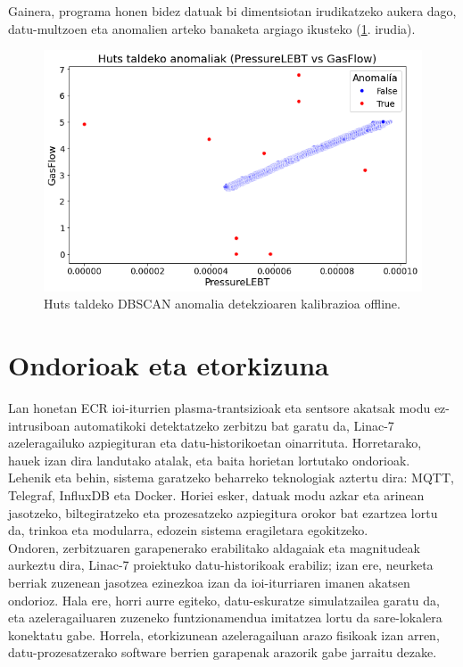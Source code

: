 \documentclass[12pt]{article}
\numberwithin{figure}{section}
\numberwithin{equation}{section}
\begin{document}
Gainera, programa honen bidez datuak bi dimentsiotan irudikatzeko aukera dago, datu-multzoen eta anomalien arteko banaketa argiago ikusteko (\ref{fig:dbscan_anomaliak_2}. irudia).
\begin{figure}[h]
    \centering
    \includegraphics[width=0.6\linewidth]{5 - Zerbitzuaren garapena/dbscan_anomaliak2.png}
    \caption{Huts taldeko DBSCAN anomalia detekzioaren kalibrazioa offline.}
    \label{fig:dbscan_anomaliak_2}
\end{figure}
\newpage
\section{Ondorioak eta etorkizuna}
Lan honetan ECR ioi-iturrien plasma-trantsizioak eta sentsore akatsak modu ez-intrusiboan automatikoki detektatzeko zerbitzu bat garatu da, Linac-7 azeleragailuko azpiegituran eta datu-historikoetan oinarrituta. Horretarako, hauek izan dira landutako atalak, eta baita horietan lortutako ondorioak.\\

Lehenik eta behin, sistema garatzeko beharreko teknologiak aztertu dira: MQTT, Telegraf, InfluxDB eta Docker. Horiei esker, datuak modu azkar eta arinean jasotzeko, biltegiratzeko eta prozesatzeko azpiegitura orokor bat ezartzea lortu da, trinkoa eta modularra, edozein sistema eragiletara egokitzeko.\\

Ondoren, zerbitzuaren garapenerako erabilitako aldagaiak eta magnitudeak aurkeztu dira, Linac-7 proiektuko datu-historikoak erabiliz; izan ere, neurketa berriak zuzenean jasotzea ezinezkoa izan da ioi-iturriaren imanen akatsen ondorioz. Hala ere, horri aurre egiteko, datu-eskuratze simulatzailea garatu da, eta azeleragailuaren zuzeneko funtzionamendua imitatzea lortu da sare-lokalera konektatu gabe. Horrela, etorkizunean azeleragailuan arazo fisikoak izan arren, datu-prozesatzerako software berrien garapenak arazorik gabe jarraitu dezake.\\
\end{document}
